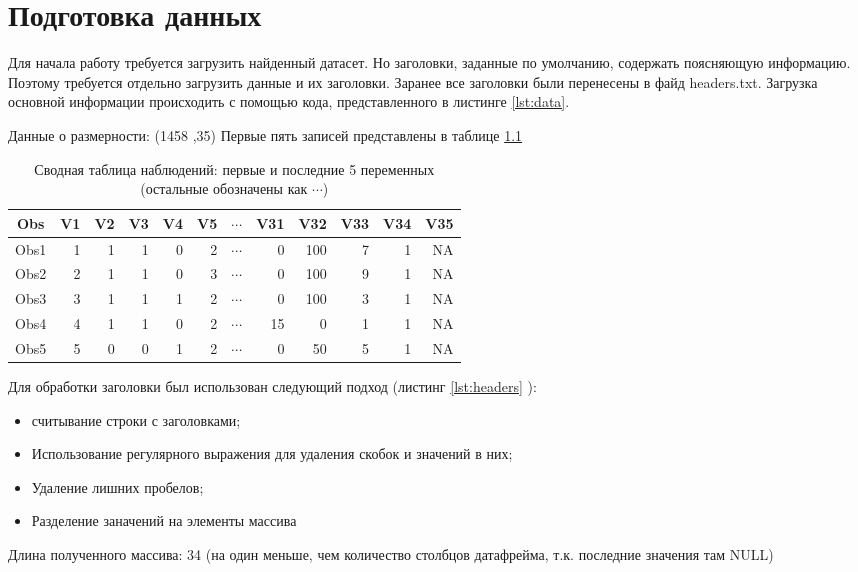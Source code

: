 \chapter{Подготовка данных}
Для начала работу требуется загрузить найденный датасет. 
Но заголовки, заданные по умолчанию, содержать поясняющую информацию. 
Поэтому требуется отдельно загрузить данные и их заголовки.
Заранее все заголовки были перенесены в файд headers.txt.
Загрузка основной информации происходить с помощью кода, представленного в листинге \ref{lst:data}.



Данные о размерности: (1458 ,35)
Первые пять записей представлены в таблице \ref{tab:truncated_table}
\begin{table}[ht]
	\centering
	\caption{Сводная таблица наблюдений: первые и последние 5 переменных (остальные обозначены как $\cdots$)}
	\scriptsize
	\setlength{\tabcolsep}{7pt}
	\begin{tabular}{|c|r r r r r c r r r r r|}
		\hline
		Obs & V1 & V2 & V3 & V4 & V5 & $\cdots$ & V31 & V32 & V33 & V34 & V35 \\
		\hline
		Obs1 & 1 & 1 & 1 & 0 & 2 & $\cdots$ & 0 & 100 & 7 & 1 & NA \\
		Obs2 & 2 & 1 & 1 & 0 & 3 & $\cdots$ & 0 & 100 & 9 & 1 & NA \\
		Obs3 & 3 & 1 & 1 & 1 & 2 & $\cdots$ & 0 & 100 & 3 & 1 & NA \\
		Obs4 & 4 & 1 & 1 & 0 & 2 & $\cdots$ & 15 & 0 & 1 & 1 & NA \\
		Obs5 & 5 & 0 & 0 & 1 & 2 & $\cdots$ & 0 & 50 & 5 & 1 & NA \\
		\hline
	\end{tabular}
	\label{tab:truncated_table}
\end{table}



Для обработки заголовки был использован следующий подход (листинг \ref{lst:headers} ):
\begin{itemize}
	\item считывание строки с заголовками;
	\item Использование регулярного выражения для удаления скобок и значений в них;
	\item Удаление лишних пробелов;
	\item Разделение заначений на элементы массива
\end{itemize}


Длина полученного массива: 34 (на один меньше, чем количество столбцов датафрейма, т.к. последние значения там NULL)

